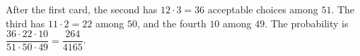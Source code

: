 After the first card, the second has $12\cdot3=36$ acceptable choices among $51$. The third has $11\cdot2=22$ among $50$, and the fourth $10$ among $49$. The probability is $\dfrac{36\cdot22\cdot10}{51\cdot50\cdot49}=\boxed{\dfrac{264}{4165}}$.
